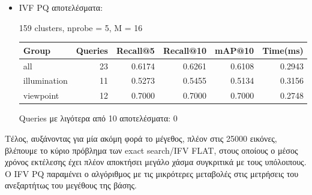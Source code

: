 \documentclass [conference]{IEEEtran}
\begin{document}
\begin{itemize}
    \item IVF PQ αποτελέσματα:
    \begin{table}[H]
    \centering
    \small
    \setlength{\tabcolsep}{3pt}
    159 clusters, nprobe = 5, M = 16
    \par\smallskip
    \begin{tabular}{l r r r r r}
    \hline
    \textbf{Group} & \textbf{Queries} & \textbf{Recall@5} & \textbf{Recall@10} & \textbf{mAP@10} & \textbf{Time(ms)} \\
    \hline
    all & 23 & 0.6174 & 0.6261 & 0.6108 & 0.2943 \\
    illumination & 11 & 0.5273 & 0.5455 & 0.5134 & 0.3156 \\
    viewpoint & 12 & 0.7000 & 0.7000 & 0.7000 & 0.2748 \\
    \hline
    \end{tabular}
    \par\smallskip
    \footnotesize Queries με λιγότερα από 10 αποτελέσματα: 0
    \end{table}

    
\end{itemize}

Τέλος, αυξάνοντας για μία ακόμη φορά το μέγεθος, πλέον στις 25000 εικόνες, βλέπουμε το κύριο πρόβλημα των exact search/IFV FLAT, στους οποίους ο μέσος χρόνος εκτέλεσης έχει πλέον αποκτήσει μεγάλο χάσμα συγκριτικά με τους υπόλοιπους. Ο IFV PQ παραμένει ο αλγόριθμος με τις μικρότερες μεταβολές στις μετρήσεις του ανεξαρτήτως του μεγέθους της βάσης. 
\end{document}
